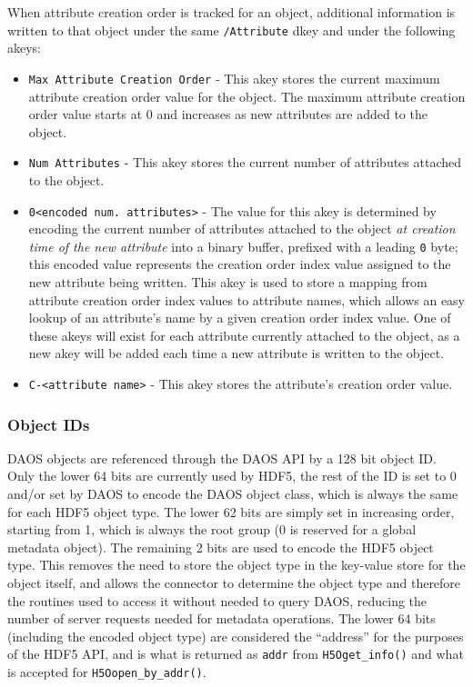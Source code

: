 When attribute creation order is tracked for an object, additional information is written to that object under the same \verb+/Attribute+ dkey and under the following akeys:

\begin{itemize}
    \item \verb+Max Attribute Creation Order+ - This akey stores the current maximum attribute creation order value for the object. The maximum attribute creation order value starts at 0 and increases as new attributes are added to the object.
    \item \verb+Num Attributes+ - This akey stores the current number of attributes attached to the object.
    \item \verb+0<encoded num. attributes>+ - The value for this akey is determined by encoding the current number of attributes attached to the object \textit{at creation time of the new attribute} into a binary buffer, prefixed with a leading \verb+0+ byte; this encoded value represents the creation order index value assigned to the new attribute being written. This akey is used to store a mapping from attribute creation order index values to attribute names, which allows an easy lookup of an attribute's name by a given creation order index value. One of these akeys will exist for each attribute currently attached to the object, as a new akey will be added each time a new attribute is written to the object.
    \item \verb+C-<attribute name>+ - This akey stores the attribute's creation order value.
\end{itemize}


\newpage

\subsubsection{Object IDs}


DAOS objects are referenced through the DAOS API by a 128 bit object ID. Only the lower 64 bits are currently used by HDF5, the rest of the ID is set to 0 and/or set by DAOS to encode the DAOS object class, which is always the same for each HDF5 object type. The lower 62 bits are simply set in increasing order, starting from 1, which is always the root group (0 is reserved for a global metadata object). The remaining 2 bits are used to encode the HDF5 object type. This
removes the need to store the object type in the key-value store for the object itself, and allows the connector to determine the object type and therefore the routines used to access it without needed to query DAOS, reducing the number of server requests needed for metadata operations. The lower 64 bits (including the encoded object type) are considered the “address” for the purposes of the HDF5 API, and is what is returned as \verb+addr+ from \verb+H5Oget_info()+ and what is accepted for \verb+H5Oopen_by_addr()+.

